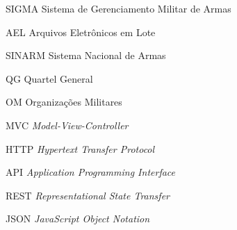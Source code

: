 \begin{siglas}
  \item[SIGMA] Sistema de Gerenciamento Militar de Armas
  \item[AEL] Arquivos Eletrônicos em Lote 
  \item[SINARM] Sistema Nacional de Armas 
  \item[QG] Quartel General
  \item[OM] Organizações Militares
  \item[MVC] \textit{Model-View-Controller}
  \item[HTTP] \textit{Hypertext Transfer Protocol}
  \item[API] \textit{Application Programming Interface}
  \item[REST] \textit{Representational State Transfer}
  \item[JSON] \textit{JavaScript Object Notation}
  
\end{siglas}